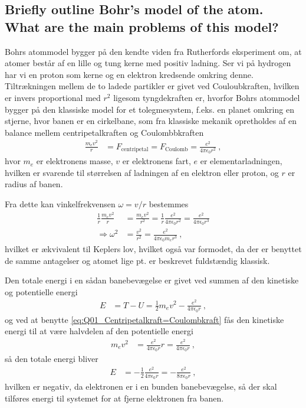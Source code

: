 \subsection{Briefly outline Bohr's model of the atom. What are the main problems of this model?}

Bohrs atommodel bygger på den kendte viden fra Rutherfords eksperiment om, at atomer består af en lille og tung kerne med positiv ladning. Ser vi på hydrogen har vi en proton som kerne og en elektron kredsende omkring denne. Tiltrækningen mellem de to ladede partikler er givet ved Couloubkraften, hvilken er invers proportional med $r^2$ ligesom tyngdekraften er, hvorfor Bohrs atommodel bygger på den klassiske model for et tolegmesystem, f.eks. en planet omkring en stjerne, hvor banen er en cirkelbane, som fra klassiske mekanik opretholdes af en balance mellem centripetalkraften og Coulombbkraften
\begin{align} \label{eq:Q01_Centripetalkraft=Coulombkraft}
	\frac{m_e v^2}{r} &= F_\text{centripetal} = F_\text{Coulomb} = \frac{e^2}{4\pi\epsilon_0 r^2} \: ,
\end{align}
hvor $m_e$ er elektronens masse, $v$ er elektronens fart, $e$ er elementarladningen, hvilken er svarende til størrelsen af ladningen af en elektron eller proton, og $r$ er radius af banen.

Fra dette kan vinkelfrekvensen $\omega = v/r$ bestemmes
\begin{align}
    \frac{1}{r}\frac{m_e v^2}{r} &= \frac{m_e v^2}{r^2} = \frac{1}{r}\frac{e^2}{4\pi\epsilon_0 r^2} = \frac{e^2}{4\pi\epsilon_0 r^3} \nonumber\\
    \Rightarrow \omega^2 &= \frac{v^2}{r^2} = \frac{e^2}{4\pi\epsilon_0 m_e r^3} \: ,
\end{align}
hvilket er ækvivalent til Keplers lov, hvilket også var formodet, da der er benyttet de samme antagelser og atomet lige pt. er beskrevet fuldstændig klassisk.

Den totale energi i en sådan banebevægelse er givet ved summen af den kinetiske og potentielle energi
\begin{align}
    E &= T - U = \frac{1}{2}m_e v^2 - \frac{e^2}{4\pi\epsilon_0 r} \: ,
\end{align}
og ved at benytte \cref{eq:Q01_Centripetalkraft=Coulombkraft} fås den kinetiske energi til at være halvdelen af den potentielle energi
\begin{align}
    m_e v^2 &= \frac{e^2}{4\pi\epsilon_0 r}r = \frac{e^2}{4\pi\epsilon_0 r} \: ,
\end{align}
så den totale energi bliver
\begin{align} \label{eq:Q01_TotalenergiIHydrogenAtom}
    E &= - \frac{1}{2}\frac{e^2}{4\pi\epsilon_0 r} = - \frac{e^2}{8\pi\epsilon_0 r} \: ,
\end{align}
hvilken er negativ, da elektronen er i en bunden banebevægelse, så der skal tilføres energi til systemet for at fjerne elektronen fra banen.

